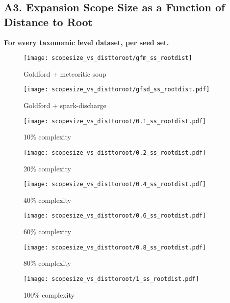 \newpage
\subsection*{A3. Expansion Scope Size as a Function of Distance to Root}
\textbf{For every taxonomic level dataset, per seed set.}

\begin{figure}[H]
    \centering
    \texttt{[image: scopesize\_vs\_disttoroot/gfm\_ss\_rootdist]}
    \caption{Goldford + meteoritic soup}
    \label{gfm_scopesize}
\end{figure}   

\begin{figure}[H]
    \centering
    \texttt{[image: scopesize\_vs\_disttoroot/gfsd\_ss\_rootdist.pdf]}
    \caption{Goldford + spark-discharge}
    \label{gfsd_scopesize}
\end{figure}   

\begin{figure}[H]
    \centering
    \texttt{[image: scopesize\_vs\_disttoroot/0.1\_ss\_rootdist.pdf]}
    \caption{10\% complexity}
    \label{0.1_scopesize}
\end{figure}   

\begin{figure}[H]
    \centering
    \texttt{[image: scopesize\_vs\_disttoroot/0.2\_ss\_rootdist.pdf]}
    \caption{20\% complexity}
    \label{0.2_scopesize}
\end{figure}   

\begin{figure}[H]
    \centering
    \texttt{[image: scopesize\_vs\_disttoroot/0.4\_ss\_rootdist.pdf]}
    \caption{40\% complexity}
    \label{0.4_scopesize}
\end{figure}   

\begin{figure}[H]
    \centering
    \texttt{[image: scopesize\_vs\_disttoroot/0.6\_ss\_rootdist.pdf]}
    \caption{60\% complexity}
    \label{0.6_scopesize}
\end{figure}   

\begin{figure}[H]
    \centering
    \texttt{[image: scopesize\_vs\_disttoroot/0.8\_ss\_rootdist.pdf]}
    \caption{80\% complexity}
    \label{0.8_scopesize}
\end{figure}   

\begin{figure}[H]
    \centering
    \texttt{[image: scopesize\_vs\_disttoroot/1\_ss\_rootdist.pdf]}
    \caption{100\% complexity}
    \label{1_scopesize}
\end{figure}   

